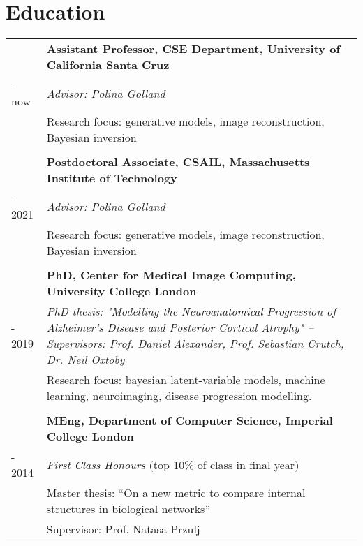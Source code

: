 \documentclass[a4paper,10pt]{article} %
\begin{document}
\vspace{-0.5em}

\section*{Education}


\begin{tabular}{>{\raggedleft\arraybackslash} p{0.93cm}|p{15.7cm}}
2022 & \large\textbf{Assistant Professor, CSE Department, University of California Santa Cruz} \\
- now & \emph{Advisor: Polina Golland}\\
& Research focus: generative models, image reconstruction, Bayesian inversion\\

&\\


2019 & \large\textbf{Postdoctoral Associate, CSAIL, Massachusetts Institute of Technology} \\
- 2021 & \emph{Advisor: Polina Golland}\\
& Research focus: generative models, image reconstruction, Bayesian inversion\\

&\\

2014 & \large\textbf{PhD, Center for Medical Image Computing, University College London}\\
- 2019 & \emph{PhD thesis: "Modelling the Neuroanatomical Progression of
Alzheimer’s Disease and Posterior Cortical Atrophy" -- \small Supervisors: Prof. Daniel Alexander, Prof. Sebastian Crutch, Dr. Neil Oxtoby}\\

& Research focus: bayesian latent-variable models, machine learning, neuroimaging, disease progression modelling.\\

\\
2010 & \large\textbf{MEng, Department of  Computer Science, Imperial College London}\\
- 2014 & \emph{First Class Honours} (top 10\% of class in final year) \\
& Master thesis: ``On a new metric to compare internal structures in biological
networks''\\
& \small Supervisor: Prof. Natasa Przulj\\
\end{tabular}
\end{document}
